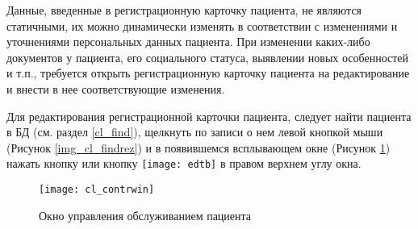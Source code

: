 {Данные, введенные в регистрационную карточку пациента, не являются статичными, их можно динамически изменять в соответствии с изменениями и уточнениями персональных данных пациента. При изменении каких-либо документов у пациента, его социального статуса, выявлении новых особенностей и т.п., требуется открыть регистрационную карточку пациента на редактирование и внести в нее соответствующие изменения. 

Для редактирования регистрационной карточки пациента, следует найти пациента в БД (см. раздел \ref{cl_find}), щелкнуть по записи о нем левой кнопкой мыши (Рисунок \ref{img_cl_findrez}) и в появившемся всплывающем окне (Рисунок \ref{img_cl_contrwin}) нажать кнопку  или кнопку \texttt{[image: edtb]} в правом верхнем углу окна. 
}{}

\begin{figure}[ht]\centering
 \texttt{[image: cl\_contrwin]}
 \caption{Окно управления обслуживанием пациента}
 \label{img_cl_contrwin}
\end{figure} 

